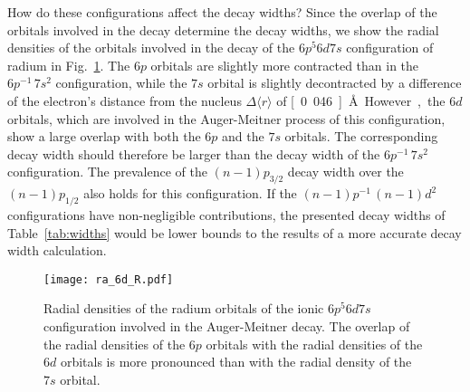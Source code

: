 How do these configurations affect the decay widths? Since the overlap of the
orbitals involved in the decay determine the decay widths, we show the
radial densities of the orbitals involved in the decay of the $6p^5 6d 7s$
configuration of radium in Fig.~\ref{fig:radial_ra}.
The $6p$ orbitals are slightly more contracted than in the $6p^{-1} \,7s^2$
configuration, while the $7s$ orbital is slightly decontracted by a difference
of the electron's distance from the nucleus $\Delta \langle r \rangle$
of \unit[0.046]{\AA}.
However, the $6d$ orbitals, which are involved
in the Auger-Meitner process of this configuration, show a large overlap with both
the $6p$ and the $7s$ orbitals. The corresponding decay width should therefore
be larger than the decay width of the $6p^{-1} \,7s^2$ configuration.
The prevalence of the $(n-1)p_{3/2}$ decay width over the $(n-1)p_{1/2}$
also holds for this configuration.
If the $(n-1)p^{-1} \,(n-1)d^2$ configurations
have non-negligible contributions,
the presented decay widths of Table~\ref{tab:widths} would be
lower bounds to the results of a more accurate decay width calculation.

\begin{figure}[h]
 \centering
 \texttt{[image: ra\_6d\_R.pdf]}
 \caption{Radial densities of the radium orbitals of the ionic $6p^5 6d 7s$
          configuration involved in the Auger-Meitner decay. The overlap of the radial
          densities of the $6p$ orbitals with the radial densities of the $6d$ orbitals
          is more pronounced than with the radial density of the $7s$ orbital.}
 \label{fig:radial_ra}
\end{figure}

